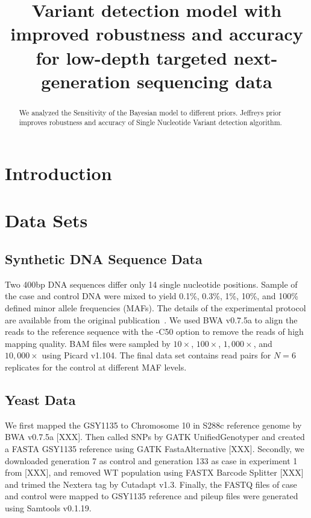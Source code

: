 \documentclass[11pt,reqno]{amsart}
\title[RVD3]{Variant detection model with improved robustness and accuracy for low-depth targeted next-generation sequencing data}
\author{}
\begin{document}
\begin{abstract}

We analyzed the Sensitivity of the Bayesian model to different priors. Jeffreys prior improves robustness and accuracy of Single Nucleotide Variant detection algorithm.

\end{abstract}

\maketitle

\section{Introduction}





\section{Data Sets}

\subsection{Synthetic DNA Sequence Data}

Two 400bp DNA sequences differ only 14 single nucleotide positions. Sample of the case and control DNA were mixed to yield 0.1\%, 0.3\%, 1\%, 10\%, and 100\% defined minor allele frequencies (MAFs). The details of the experimental protocol are available from the original publication~\citep{Flaherty:2011ja}. We used BWA v0.7.5a to align the reads to the reference sequence with the -C50 option to remove the reads of high mapping quality. BAM files were sampled by $10\times$, $100\times$, $1,000\times$, and $10,000\times$ using Picard v1.104. The final data set contains read pairs for $N=6$ replicates for the control at different MAF levels.

\subsection{Yeast Data}
We first mapped the GSY1135 to Chromosome 10 in S288c reference genome by BWA v0.7.5a [XXX]. Then called SNPs by GATK UnifiedGenotyper and created a FASTA GSY1135 reference using GATK FastaAlternative [XXX].
Secondly, we downloaded generation 7 as control and generation 133 as case in experiment 1 from [XXX], and removed WT population using FASTX Barcode Splitter [XXX] and trimed the Nextera tag by Cutadapt v1.3.
Finally, the FASTQ files of case and control were mapped to GSY1135 reference and pileup files were generated using Samtools v0.1.19.
\end{document}
